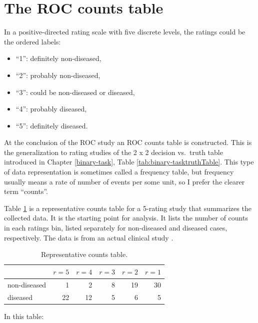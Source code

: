 \documentclass[
]{book}
\providecommand{\tightlist}{%
  \setlength{\itemsep}{0pt}\setlength{\parskip}{0pt}}
\begin{document}
\hypertarget{binary-task-roc-counts-table}{%
\section{The ROC counts table}\label{binary-task-roc-counts-table}}

In a positive-directed rating scale with five discrete levels, the ratings could be the ordered labels:

\begin{itemize}
\tightlist
\item
  ``1'': definitely non-diseased,
\item
  ``2'': probably non-diseased,
\item
  ``3'': could be non-diseased or diseased,
\item
  ``4'': probably diseased,
\item
  ``5'': definitely diseased.
\end{itemize}

At the conclusion of the ROC study an ROC counts table is constructed. This is the generalization to rating studies of the 2 x 2 decision vs.~truth table introduced in Chapter \ref{binary-task}, Table \ref{tab:binary-tasktruthTable}. This type of data representation is sometimes called a frequency table, but frequency usually means a rate of number of events per some unit, so I prefer the clearer term ``counts''.

Table \ref{tab:ratings-paradigmExampleTable} is a representative counts table for a 5-rating study that summarizes the collected data. It is the starting point for analysis. It lists the number of counts in each ratings bin, listed separately for non-diseased and diseased cases, respectively. The data is from an actual clinical study \citep{RN4343}.

\begin{table}

\caption{\label{tab:ratings-paradigmExampleTable}Representative counts table.}
\centering
\begin{tabular}[t]{l|r|r|r|r|r}
\hline
  & $r = 5$ & $r = 4$ & $r = 3$ & $r = 2$ & $r = 1$\\
\hline
non-diseased & 1 & 2 & 8 & 19 & 30\\
\hline
diseased & 22 & 12 & 5 & 6 & 5\\
\hline
\end{tabular}
\end{table}

In this table:
\end{document}
